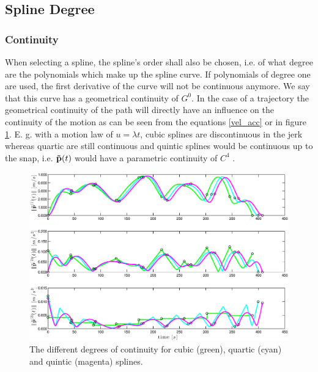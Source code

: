 \subsection{Spline Degree}

\subsubsection{Continuity}
When selecting a spline, the spline's order shall also be chosen, i.e. of what degree are the polynomials which make up the spline curve. If polynomials of degree one are used, the first derivative of the curve will not be continuous anymore. We say that this curve has a geometrical continuity of $G^0$. In the case of a trajectory the geometrical continuity of the path will directly have an influence on the continuity of the motion as can be seen from the equations \eqref{vel_acc} or in figure \ref{fig:continuity}. E. g. with a motion law of $u=\lambda t$, cubic splines are discontinuous in the jerk whereas quartic are still continuous and quintic splines would be continuous up to the snap, i.e. ${\bf \tilde{p}}(t)$ would have a parametric continuity of $C^4$ . 

\begin{figure}[H]
	\centering
    \includegraphics[width = \textwidth]{graphics/continuity.eps}
  \caption{The different degrees of continuity for cubic (green), quartic (cyan) and quintic (magenta) splines.}
  \label{fig:continuity}
\end{figure}



